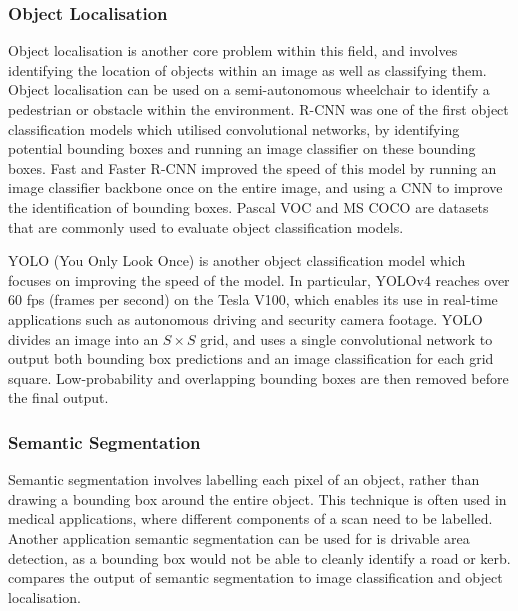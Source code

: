\subsubsection{Object Localisation}
Object localisation is another core problem within this field, and involves identifying the location of objects within an image as well as classifying them.
Object localisation can be used on a semi-autonomous wheelchair to identify
a pedestrian or obstacle within the environment. R-CNN \cite{girshickRichFeatureHierarchies2013} was one of the
first object classification models which utilised convolutional networks, by identifying potential bounding boxes
and running an image classifier on these bounding boxes. Fast and Faster R-CNN \cite{girshickFastRCNN2015}\cite{renFasterRCNNRealTime2015}
improved the speed of this model by running an image classifier backbone once on the entire image, and using a CNN to improve
the identification of bounding boxes. Pascal VOC \cite{everinghamPascalVisualObject2009} and MS COCO \cite{linMicrosoftCOCOCommon2014}
are datasets that are commonly used to evaluate object classification models.

YOLO (You Only Look Once) \cite{redmonYouOnlyLook2015}\cite{redmonYOLO9000BetterFaster2016}\cite{redmonYOLOv3IncrementalImprovement2018}\cite{bochkovskiyYOLOv4OptimalSpeed2020}
is another object classification model which focuses on improving the speed of the model. In particular, YOLOv4 \cite{bochkovskiyYOLOv4OptimalSpeed2020}
reaches over 60 fps (frames per second) on the Tesla V100, which enables its use in real-time applications such as autonomous driving and security camera footage. %
YOLO divides an image into an $S\times S$ grid, and uses a single convolutional network to output both bounding box predictions and
an image classification for each grid square. Low-probability and overlapping bounding boxes are then removed before the final output.

\subsubsection{Semantic Segmentation}
Semantic segmentation involves labelling each pixel of an object, rather than drawing a bounding box around the entire object.
This technique is often used in medical applications, where different components of a scan need to be labelled.
Another application semantic segmentation can be used for is drivable area detection, as a bounding box would not be able to cleanly
identify a road or kerb.  compares the output of semantic segmentation to image classification and object localisation.

